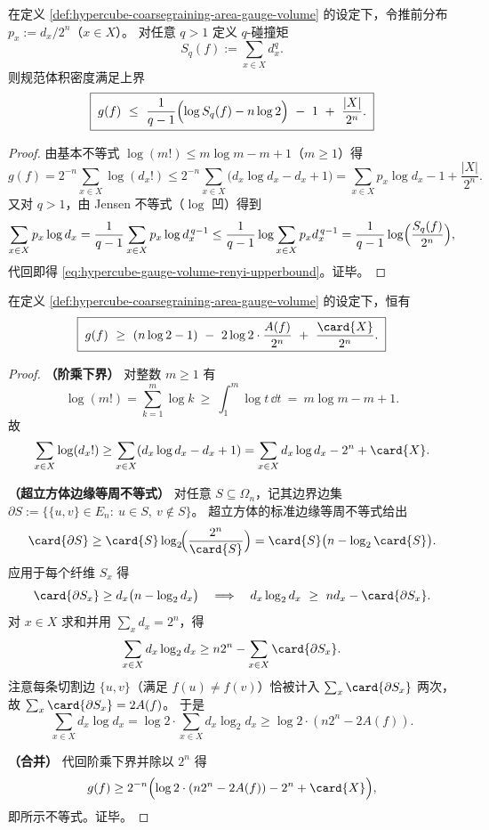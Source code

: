 \begin{proposition}\label{prop:hypercube-gauge-volume-renyi-upperbound}
在定义 \ref{def:hypercube-coarsegraining-area-gauge-volume} 的设定下，令推前分布 \(p_x:=d_x/2^n\)（\(x\in X\)）。
对任意 \(q>1\) 定义 \(q\)-碰撞矩
\[
S_q(f):=\sum_{x\in X} d_x^q.
\]
则规范体积密度满足上界
\begin{equation}\label{eq:hypercube-gauge-volume-renyi-upperbound}
\boxed{\;
g(f)\ \le\ \frac{1}{q-1}\Bigl(\log S_q(f)-n\log 2\Bigr)\ -\ 1\ +\ \frac{|X|}{2^n}.\;}
\end{equation}
\end{proposition}
\begin{proof}
由基本不等式 \(\log(m!)\le m\log m-m+1\)（\(m\ge 1\)）得
\[
g(f)=2^{-n}\sum_{x\in X}\log(d_x!)
\le 2^{-n}\sum_{x\in X}\bigl(d_x\log d_x-d_x+1\bigr)
=\sum_{x\in X}p_x\log d_x-1+\frac{|X|}{2^n}.
\]
又对 \(q>1\)，由 Jensen 不等式（\(\log\) 凹）得到
\[
\sum_{x\in X}p_x\log d_x
=\frac{1}{q-1}\sum_{x\in X}p_x\log d_x^{\,q-1}
\le \frac{1}{q-1}\log\sum_{x\in X}p_x d_x^{\,q-1}
=\frac{1}{q-1}\log\Bigl(\frac{S_q(f)}{2^n}\Bigr),
\]
代回即得 \eqref{eq:hypercube-gauge-volume-renyi-upperbound}。证毕。
\end{proof}

\begin{proposition}\label{prop:hypercube-discrete-holographic-stokes-gauge-area}
在定义 \ref{def:hypercube-coarsegraining-area-gauge-volume} 的设定下，恒有
\[
\boxed{\;
g(f)\ \ge\ (n\log 2-1)\ -\ 2\log 2\cdot\frac{A(f)}{2^n}\ +\ \frac{\card{X}}{2^n}.
\;}
\]
\end{proposition}

\begin{proof}
\textbf{（阶乘下界）}
对整数 \(m\ge 1\) 有
\[
\log(m!)=\sum_{k=1}^{m}\log k\ \ge\ \int_{1}^{m}\log t\,\dd t\ =\ m\log m-m+1.
\]
故
\[
\sum_{x\in X}\log(d_x!)
\ge
\sum_{x\in X}(d_x\log d_x-d_x+1)
=
\sum_{x\in X}d_x\log d_x-2^n+\card{X}.
\]

\textbf{（超立方体边缘等周不等式）}
对任意 \(S\subseteq \Omega_n\)，记其边界边集
\(
\partial S:=\{\{u,v\}\in E_n:\ u\in S,\ v\notin S\}
\)。
超立方体的标准边缘等周不等式给出
\[
\card{\partial S}
\ge
\card{S}\log_2\!\Bigl(\frac{2^n}{\card{S}}\Bigr)
=
\card{S}\bigl(n-\log_2\card{S}\bigr).
\]
应用于每个纤维 \(S_x\) 得
\[
\card{\partial S_x}\ge d_x\bigl(n-\log_2 d_x\bigr)
\quad\Longrightarrow\quad
d_x\log_2 d_x\ \ge\ nd_x-\card{\partial S_x}.
\]
对 \(x\in X\) 求和并用 \(\sum_x d_x=2^n\)，得
\[
\sum_{x\in X}d_x\log_2 d_x
\ge
n2^n-\sum_{x\in X}\card{\partial S_x}.
\]
注意每条切割边 \(\{u,v\}\)（满足 \(f(u)\neq f(v)\)）恰被计入 \(\sum_x\card{\partial S_x}\) 两次，故 \(\sum_x\card{\partial S_x}=2A(f)\)。
于是
\[
\sum_{x\in X}d_x\log d_x
=
\log 2\cdot \sum_{x\in X}d_x\log_2 d_x
\ge
\log 2\cdot (n2^n-2A(f)).
\]

\textbf{（合并）}
代回阶乘下界并除以 \(2^n\) 得
\[
g(f)
\ge
2^{-n}\Bigl(\log 2\cdot (n2^n-2A(f))-2^n+\card{X}\Bigr),
\]
即所示不等式。证毕。
\end{proof}

